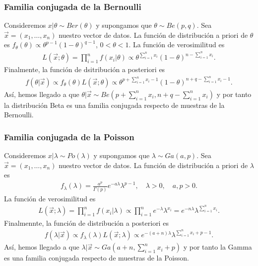 \subsubsection{Familia conjugada de la Bernoulli}
\noindent Consideremos $x | \theta \sim Ber(\theta)$ y supongamos que $\theta \sim Be(p,q)$. Sea $\vec{x} = (x_1,\ldots,x_n)$ nuestro vector de datos. La función de distribución a priori de $\theta$ es $f_{\theta}(\theta) \propto \theta^{p-1}(1-\theta)^{q-1}$, $0 < \theta < 1$. La función de verosimilitud es
\begin{align*}
    L(\vec{x};\theta) = \prod_{i=1}^{n} f(x_i | \theta) \propto \theta^{\sum_{i=1}^{n} x_i}(1-\theta)^{n - \sum_{i=1}^{n} x_i}.
\end{align*}
Finalmente, la función de dsitribución a posteriori es
\begin{align*}
    f(\theta | \vec{x}) \propto f_{\theta}(\theta)L(\vec{x};\theta) \propto \theta^{p + \sum_{i=1}^{n} x_i - 1}(1 - \theta)^{n+q - \sum_{i=1}^{n} x_i -1}.
\end{align*}
Así, hemos llegado a que $\theta | \vec{x} \sim Be\left(p + \sum_{i=1}^{n} x_i, n + q - \sum_{i=1}^{n} x_i \right)$ y por tanto la distribución Beta es una familia conjugada respecto de muestras de la Bernoulli.

\subsubsection{Familia conjugada de la Poisson}
\noindent Consideremos $x | \lambda \sim Po(\lambda)$ y supongamos que $\lambda \sim Ga(a,p)$. Sea $\vec{x} = (x_1,\ldots,x_n)$ nuestro vector de datos. La función de distribución a priori de $\lambda$ es
\begin{align*}
    f_{\lambda}(\lambda) = \frac{a^p}{\Gamma(p)}e^{-a\lambda}\lambda^{p-1}, \quad \lambda > 0, \quad a,p > 0.
\end{align*}
La función de verosimilitud es
\begin{align*}
    L(\vec{x};\lambda) = \prod_{i=1}^{n} f(x_i | \lambda) \propto \prod_{i=1}^{n} e^{-\lambda} \lambda^{x_i} = e^{-n \lambda} \lambda^{\sum_{i=1}^{n} x_i}.
\end{align*}
Finalmennte, la función de distribución a posteriori es
\begin{align*}
    f(\lambda | \vec{x}) \propto f_{\lambda}(\lambda)L(\vec{x};\lambda) \propto e^{-(a+n)\lambda} \lambda^{\sum_{i=1}^{n} x_i + p - 1}.
\end{align*}
Así, hemos llegado a que $\lambda | \vec{x} \sim Ga\left(a + n, \sum_{i=1}^{n} x_i + p\right)$ y por tanto la Gamma es una familia conjugada respecto de muestras de la Poisson.

